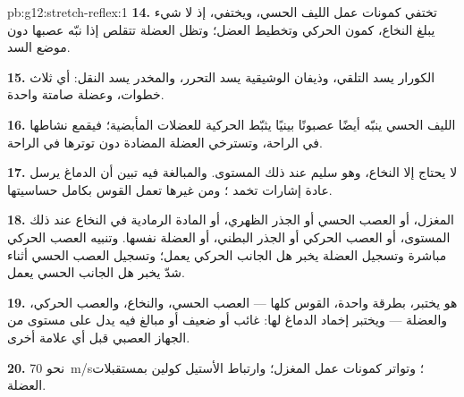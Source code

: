 \begin{solution}{pb:g12:stretch-reflex:1}
\textbf{14.} تختفي كمونات عمل الليف الحسي، ويختفي، إذ لا شيء يبلغ
النخاع، كمون  الحركي وتخطيط العضل؛ وتظل العضلة تتقلص إذا نبّه
عصبها دون موضع السد.

\textbf{15.} الكورار يسد التلقي، وذيفان الوشيقية يسد التحرر، والمخدر
يسد النقل: أي ثلاث خطوات، وعضلة صامتة واحدة.

\textbf{16.} الليف الحسي ينبّه أيضًا عصبونًا بينيًا يثبّط 
الحركية للعضلات المأبضية؛ فيقمع نشاطها في الراحة، وتسترخي العضلة
المضادة دون توترها في الراحة.

\textbf{17.}  لا يحتاج إلا النخاع، وهو سليم عند ذلك المستوى.
والمبالغة فيه تبين أن الدماغ يرسل عادة إشارات تخمد ؛ ومن غيرها
تعمل القوس بكامل حساسيتها.

\textbf{18.} المغزل، أو العصب الحسي أو الجذر الظهري، أو المادة الرمادية
في النخاع عند ذلك المستوى، أو العصب الحركي أو الجذر البطني، أو العضلة
نفسها. وتنبيه العصب الحركي مباشرة وتسجيل العضلة يخبر هل الجانب الحركي
يعمل؛ وتسجيل العصب الحسي أثناء شدّ يخبر هل الجانب الحسي يعمل.

\textbf{19.} هو يختبر، بطرقة واحدة، القوس كلها --- العصب الحسي،
والنخاع، والعصب الحركي، والعضلة --- ويختبر إخماد الدماغ لها: 
غائب أو ضعيف أو مبالغ فيه يدل على مستوى من الجهاز العصبي قبل أي علامة
أخرى.

\textbf{20.} نحو \qty{70}{m/s}؛ وتواتر كمونات عمل المغزل؛ وارتباط
الأستيل كولين بمستقبلات العضلة.
\end{solution}
